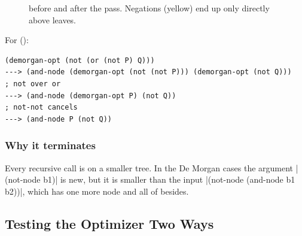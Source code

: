 \begin{figure}[htbp]
\centering
{}
\hspace{0.8cm}
\hspace{0.8cm}
\caption{ before and after the pass. Negations (yellow) end up only directly above leaves.}
\label{fig:demorgan}
\end{figure}

For  ():
\begin{lstlisting}[style=repl]
(demorgan-opt (not (or (not P) Q)))
---> (and-node (demorgan-opt (not (not P))) (demorgan-opt (not Q)))   ; not over or
---> (and-node (demorgan-opt P) (not Q))                              ; not-not cancels
---> (and-node P (not Q))
\end{lstlisting}

\subsubsection{Why it terminates} Every recursive call is on a smaller tree. In the De Morgan cases the argument \rkt|(not-node b1)| is new, but it is smaller than the input \rkt|(not-node (and-node b1 b2))|, which has one more node and all of  besides.

\subsection{Testing the Optimizer Two Ways}

